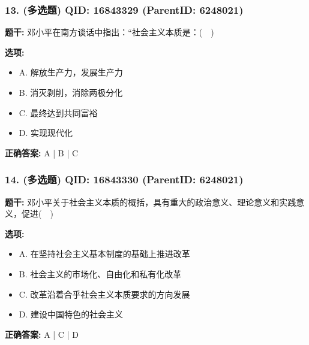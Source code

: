 \documentclass[12pt,UTF8]{ctexart}
\begin{document}
\subsubsection*{13. (多选题) \small QID: 16843329 (ParentID: 6248021)}

\textbf{题干:}
邓小平在南方谈话中指出：“社会主义本质是：(  )



\textbf{选项:}
\begin{itemize}[leftmargin=*]

  \item A. 解放生产力，发展生产力

  \item B. 消灭剥削，消除两极分化

  \item C. 最终达到共同富裕

  \item D. 实现现代化

\end{itemize}

\textbf{正确答案:}
A | B | C

\vspace{0.3em}\hrulefill\vspace{0.7em}

\subsubsection*{14. (多选题) \small QID: 16843330 (ParentID: 6248021)}

\textbf{题干:}
邓小平关于社会主义本质的概括，具有重大的政治意义、理论意义和实践意义，促进(  )



\textbf{选项:}
\begin{itemize}[leftmargin=*]

  \item A. 在坚持社会主义基本制度的基础上推进改革

  \item B. 社会主义的市场化、自由化和私有化改革

  \item C. 改革沿着合乎社会主义本质要求的方向发展

  \item D. 建设中国特色的社会主义

\end{itemize}

\textbf{正确答案:}
A | C | D

\vspace{0.3em}\hrulefill\vspace{0.7em}
\end{document}
